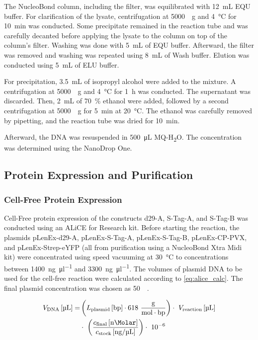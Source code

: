 The NucleoBond column, including the filter, was equilibrated with \SI{12}{\milli\liter} EQU buffer. For clarification of the lysate, centrifugation at \SI{5000}{\times g} and \SI{4}{\celsius} for \SI{10}{\minute} was conducted. Some precipitate remained in the reaction tube and was carefully decanted before applying the lysate to the column on top of the column's filter. Washing was done with \SI{5}{\milli\liter} of EQU buffer. Afterward, the filter was removed and washing was repeated using \SI{8}{\milli\liter} of Wash buffer. Elution was conducted using \SI{5}{\milli\liter} of ELU buffer.

For precipitation, \SI{3.5}{\milli\liter} of isopropyl alcohol were added to the mixture. A centrifugation at \SI{5000}{\times g} and \SI{4}{\celsius} for \SI{1}{\hour} was conducted. The supernatant was discarded. Then, \SI{2}{\milli\liter} of \SI{70}{\percent} ethanol were added, followed by a second centrifugation at \SI{5000}{\times g} for \SI{5}{\minute} at \SI{20}{\celsius}. The ethanol was carefully removed by pipetting, and the reaction tube was dried for \SI{10}{\minute}. 

Afterward, the DNA was resuspended in \SI{500}{\micro\liter} MQ-H\textsubscript{2}O. The concentration was determined using the NanoDrop\textsuperscript{\texttrademark} One.

\subsection{Protein Expression and Purification}
\subsubsection{Cell-Free Protein Expression}
Cell-Free protein expression of the constructs d29-A, S-Tag-A, and S-Tag-B was conducted using an ALiCE\textsuperscript{\textregistered} for Research kit. Before starting the reaction, the plasmids pLenEx-d29-A, pLenEx-S-Tag-A, pLenEx-S-Tag-B, pLenEx-CP-PVX, and pLenEx-Strep-eYFP (all from purification using a NucleoBond Xtra Midi kit) were concentrated using speed vacuuming at \SI{30}{\degreeCelsius} to concentrations between \SI{1400}{\nano\gram\per\micro\litre} and \SI{3300}{\nano\gram\per\micro\litre}. The volumes of plasmid DNA to be used for the cell-free reaction were calculated according to \autoref{eq:alice_calc}. The final plasmid concentration was chosen as \SI{50}{\nano\Molar}. 

\begin{align}
    \label{eq:alice_calc}
    \begin{split}
V_{\text{DNA}}\, [\si{\micro\liter}] =&\left( L_{\text{plasmid}}\, [\text{bp}] \cdot 618\ \frac{\text{g}}{\text{mol} \cdot \text{bp}} \right) \cdot\ V_{\text{reaction}}\, [\si{\micro\liter}] \\
& \cdot\ \left( \frac{c_{\text{final}}\, [\si{\nano\Molar}]}{c_{\text{stock}}\, [\si{\nano\gram}/\si{\micro\liter}]} \right) \cdot\ 10^{-6}
    \end{split}
\end{align}

